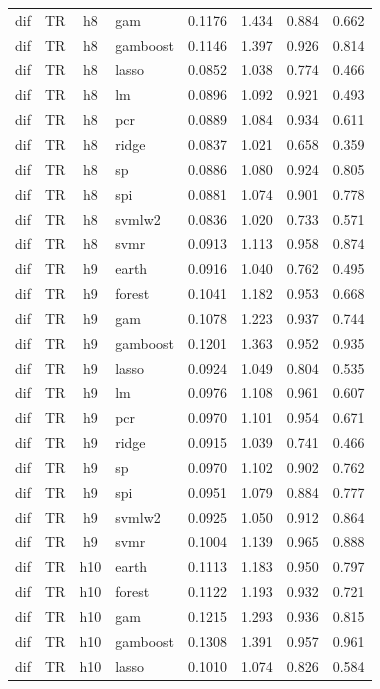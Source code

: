 \begin{ThreePartTable}
\begin{longtable}[t]{llclcccc}
dif & TR & h8 & gam & 0.1176 & 1.434 & 0.884 & 0.662\\
dif & TR & h8 & gamboost & 0.1146 & 1.397 & 0.926 & 0.814\\
dif & TR & h8 & lasso & 0.0852 & 1.038 & 0.774 & 0.466\\
dif & TR & h8 & lm & 0.0896 & 1.092 & 0.921 & 0.493\\
dif & TR & h8 & pcr & 0.0889 & 1.084 & 0.934 & 0.611\\
dif & TR & h8 & ridge & 0.0837 & 1.021 & 0.658 & 0.359\\
dif & TR & h8 & sp & 0.0886 & 1.080 & 0.924 & 0.805\\
dif & TR & h8 & spi & 0.0881 & 1.074 & 0.901 & 0.778\\
dif & TR & h8 & svmlw2 & 0.0836 & 1.020 & 0.733 & 0.571\\
dif & TR & h8 & svmr & 0.0913 & 1.113 & 0.958 & 0.874\\
\addlinespace
dif & TR & h9 & earth & 0.0916 & 1.040 & 0.762 & 0.495\\
dif & TR & h9 & forest & 0.1041 & 1.182 & 0.953 & 0.668\\
dif & TR & h9 & gam & 0.1078 & 1.223 & 0.937 & 0.744\\
dif & TR & h9 & gamboost & 0.1201 & 1.363 & 0.952 & 0.935\\
dif & TR & h9 & lasso & 0.0924 & 1.049 & 0.804 & 0.535\\
dif & TR & h9 & lm & 0.0976 & 1.108 & 0.961 & 0.607\\
dif & TR & h9 & pcr & 0.0970 & 1.101 & 0.954 & 0.671\\
dif & TR & h9 & ridge & 0.0915 & 1.039 & 0.741 & 0.466\\
dif & TR & h9 & sp & 0.0970 & 1.102 & 0.902 & 0.762\\
dif & TR & h9 & spi & 0.0951 & 1.079 & 0.884 & 0.777\\
dif & TR & h9 & svmlw2 & 0.0925 & 1.050 & 0.912 & 0.864\\
dif & TR & h9 & svmr & 0.1004 & 1.139 & 0.965 & 0.888\\
\addlinespace
dif & TR & h10 & earth & 0.1113 & 1.183 & 0.950 & 0.797\\
dif & TR & h10 & forest & 0.1122 & 1.193 & 0.932 & 0.721\\
dif & TR & h10 & gam & 0.1215 & 1.293 & 0.936 & 0.815\\
dif & TR & h10 & gamboost & 0.1308 & 1.391 & 0.957 & 0.961\\
dif & TR & h10 & lasso & 0.1010 & 1.074 & 0.826 & 0.584\\

\end{longtable}
\end{ThreePartTable}
